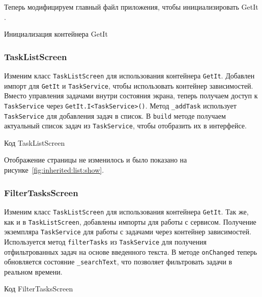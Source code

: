 Теперь модифицируем главный файл приложения,
чтобы инициализировать GetIt .

\begin{image}
	\caption{Инициализация контейнера GetIt}
	\label{fig:getit:app}
\end{image}

\subsubsection{TaskListScreen}

Изменим класс \texttt{TaskListScreen} 
для использования контейнера \texttt{GetIt}.
Добавлен импорт для \texttt{GetIt} и \texttt{TaskService},
чтобы использовать контейнер зависимостей.
Вместо управления задачами внутри состояния экрана,
теперь получаем доступ к \texttt{TaskService}
через \texttt{GetIt.I<TaskService>()}.
Метод \texttt{\_addTask} использует \texttt{TaskService}
для добавления задач в список.
В \texttt{build} методе получаем актуальный список задач
из \texttt{TaskService}, чтобы отобразить их в интерфейсе.

\begin{image}
	\caption{Код TaskListScreen}
	\label{fig:getit:list}
\end{image}

Отображение страницы не изменилось и было показано
на рисунке~\ref{fig:inherited:list:show}.

\subsubsection{FilterTasksScreen}

Изменим класс \texttt{TaskListScreen} 
для использования контейнера \texttt{GetIt}.
Так же, как и в \texttt{TaskListScreen},
добавлены импорты для работы с сервисом.
Получение экземпляра \texttt{TaskService}
для работы с задачами через контейнер зависимостей.
Используется метод \texttt{filterTasks} из \texttt{TaskService}
для получения отфильтрованных задач на основе введенного текста.
В методе \texttt{onChanged} теперь обновляется состояние
\texttt{\_searchText}, что позволяет фильтровать задачи в реальном времени.

\begin{image}
	\caption{Код FilterTasksScreen}
	\label{fig:getit:filter}
\end{image}

